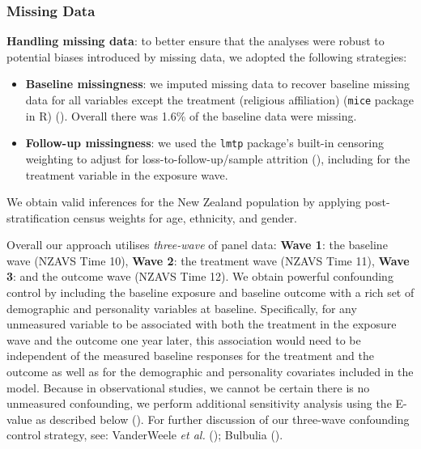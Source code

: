 \documentclass[
  singlecolumn]{article}
\begin{document}
\subsubsection{Missing Data}\label{missing-data}

\textbf{Handling missing data}: to better ensure that the analyses were
robust to potential biases introduced by missing data, we adopted the
following strategies:

\begin{itemize}
\item
  \textbf{Baseline missingness}: we imputed missing data to recover
  baseline missing data for all variables except the treatment
  (religious affiliation) (\texttt{mice} package in R)
  (). Overall there was
  1.6\% of the baseline data were missing.
\item
  \textbf{Follow-up missingness}: we used the \texttt{lmtp} package's
  built-in censoring weighting to adjust for loss-to-follow-up/sample
  attrition (),
  including for the treatment variable in the exposure wave.
\end{itemize}

We obtain valid inferences for the New Zealand population by applying
post-stratification census weights for age, ethnicity, and gender.

Overall our approach utilises \emph{three-wave} of panel data:
\textbf{Wave 1}: the baseline wave (NZAVS Time 10), \textbf{Wave 2}: the
treatment wave (NZAVS Time 11), \textbf{Wave 3}: and the outcome wave
(NZAVS Time 12). We obtain powerful confounding control by including the
baseline exposure and baseline outcome with a rich set of demographic
and personality variables at baseline. Specifically, for any unmeasured
variable to be associated with both the treatment in the exposure wave
and the outcome one year later, this association would need to be
independent of the measured baseline responses for the treatment and the
outcome as well as for the demographic and personality covariates
included in the model. Because in observational studies, we cannot be
certain there is no unmeasured confounding, we perform additional
sensitivity analysis using the E-value as described below
(). For further
discussion of our three-wave confounding control strategy, see:
VanderWeele \emph{et al.} ();
Bulbulia ().
\end{document}
